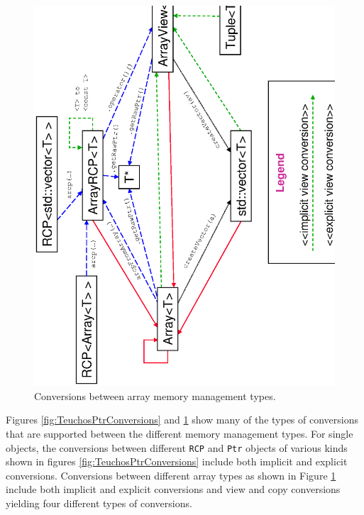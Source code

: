 \documentclass[pdf,ps2pdf,11pt]{SANDreport}
\begin{document}
{\bsinglespace
\begin{figure}[p]
\begin{center}
\includegraphics*[angle=270,scale=0.50]{TeuchosArrayConversions}
\end{center}
\caption{
\label{fig:TeuchosArrayConversions}
Conversions between array memory management types.  }
\end{figure}
\esinglespace}


Figures {}\ref{fig:TeuchosPtrConversions} and
{}\ref{fig:TeuchosArrayConversions} show many of the types of
conversions that are supported between the different memory management
types.  For single objects, the conversions between different
{}\texttt{RCP} and {}\texttt{Ptr} objects of various kinds shown in
figures {}\ref{fig:TeuchosPtrConversions} include both implicit and
explicit conversions.  Conversions between different array types as
shown in Figure {}\ref{fig:TeuchosArrayConversions} include both
implicit and explicit conversions and view and copy conversions
yielding four different types of conversions.
\end{document}
